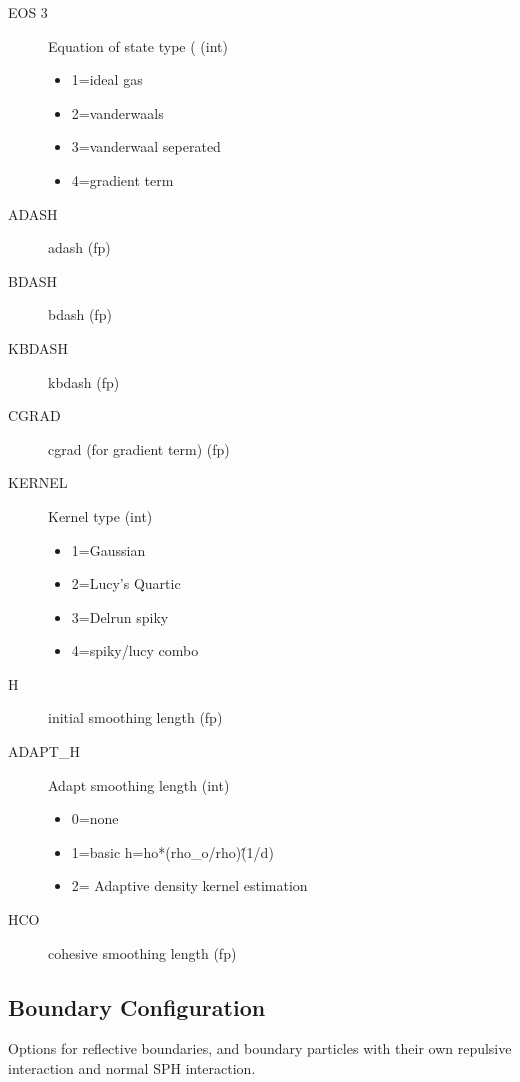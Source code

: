 \begin{description}
\item[EOS 3]       Equation of state type ( (int)
    \begin{itemize}
    \item 1=ideal gas 
    \item 2=vanderwaals 
    \item 3=vanderwaal seperated 
    \item 4=gradient term
    \end{itemize}
\item[ADASH]        adash (fp)
\item[BDASH]        bdash (fp)
\item[KBDASH]       kbdash (fp)
\item[CGRAD]        cgrad  (for gradient term)  (fp)
\item[KERNEL]       Kernel type (int)
    \begin{itemize}
       \item  1=Gaussian 
       \item  2=Lucy's Quartic 
       \item  3=Delrun spiky 
       \item  4=spiky/lucy combo
    \end{itemize}
\item[H]      initial smoothing length (fp)
\item[ADAPT\_H]       Adapt smoothing length  (int)
\begin{itemize}
\item 0=none
\item 1=basic h=ho*(rho\_o/rho)\^(1/d)
\item 2=  Adaptive density kernel estimation \cite[]{sigalotti_shock-capturing_2006}
\end{itemize}
\item[HCO]       cohesive smoothing length (fp)
\end{description}

\subsection{Boundary Configuration}
Options for reflective boundaries, and boundary particles with their own
repulsive interaction and normal SPH interaction.

